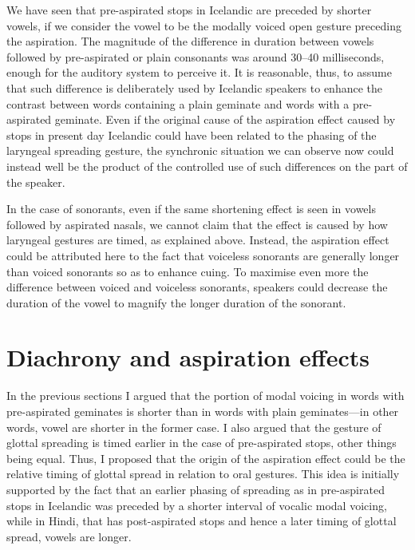 \documentclass[11pt,a4paper,openany]{memoir}\usepackage[]{graphicx}\usepackage[]{color}
\begin{document}
We have seen that pre-aspirated stops in Icelandic are preceded by shorter vowels, if we consider the vowel to be the modally voiced open gesture preceding the aspiration.
The magnitude of the difference in duration between vowels followed by pre-aspirated or plain consonants was around 30--40 milliseconds, enough for the auditory system to perceive it.
It is reasonable, thus, to assume that such difference is deliberately used by Icelandic speakers to enhance the contrast between words containing a plain geminate and words with a pre-aspirated geminate.
Even if the original cause of the aspiration effect caused by stops in present day Icelandic could have been related to the phasing of the laryngeal spreading gesture, the synchronic situation we can observe now could instead well be the product of the controlled use of such differences on the part of the speaker.

In the case of sonorants, even if the same shortening effect is seen in vowels followed by aspirated nasals, we cannot claim that the effect is caused by how laryngeal gestures are timed, as explained above.
Instead, the aspiration effect could be attributed here to the fact that voiceless sonorants are generally longer than voiced sonorants so as to enhance cuing.
To maximise even more the difference between voiced and voiceless sonorants, speakers could decrease the duration of the vowel to magnify the longer duration of the sonorant.




\section{Diachrony and aspiration effects}
In the previous sections I argued that the portion of modal voicing in words with pre-aspirated geminates is shorter than in words with plain geminates---in other words, vowel are shorter in the former case.
I also argued that the gesture of glottal spreading is timed earlier in the case of pre-aspirated stops, other things being equal.
Thus, I proposed that the origin of the aspiration effect could be the relative timing of glottal spread in relation to oral gestures. 
This idea is initially supported by the fact that an earlier phasing of spreading as in pre-aspirated stops in Icelandic was preceded by a shorter interval of vocalic modal voicing, while in Hindi, that has post-aspirated stops and hence a later timing of glottal spread, vowels are longer.
\end{document}

